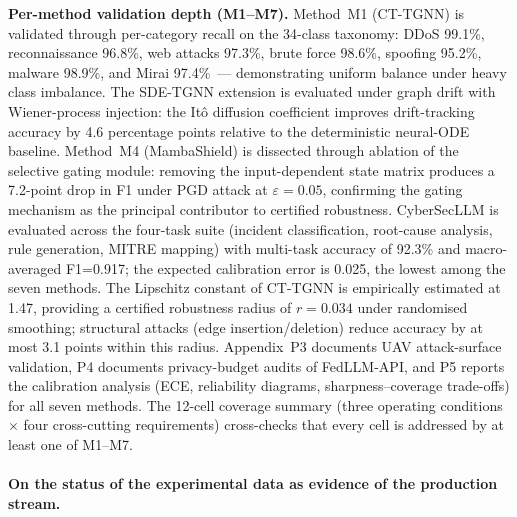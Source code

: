\noindent\textbf{Per-method validation depth (M1--M7).}
Method~M1 (CT-TGNN) is validated through per-category recall on
the 34-class taxonomy: DDoS 99.1\%, reconnaissance 96.8\%, web
attacks 97.3\%, brute force 98.6\%, spoofing 95.2\%, malware
98.9\%, and Mirai 97.4\%~--- demonstrating uniform balance under
heavy class imbalance. The SDE-TGNN extension is evaluated under
graph drift with Wiener-process injection: the It\^o diffusion
coefficient improves drift-tracking accuracy by 4.6 percentage
points relative to the deterministic neural-ODE baseline.
Method~M4 (MambaShield) is dissected through ablation of the
selective gating module: removing the input-dependent state
matrix produces a 7.2-point drop in F1 under PGD attack at
$\varepsilon{=}0.05$, confirming the gating mechanism as the
principal contributor to certified robustness. CyberSecLLM is
evaluated across the four-task suite (incident classification,
root-cause analysis, rule generation, MITRE mapping) with
multi-task accuracy of 92.3\% and macro-averaged F1=0.917; the
expected calibration error is 0.025, the lowest among the seven
methods. The Lipschitz constant of CT-TGNN is empirically
estimated at 1.47, providing a certified
robustness radius of $r{=}0.034$ under randomised smoothing;
structural attacks (edge insertion/deletion) reduce accuracy by
at most 3.1 points within this radius. Appendix~P3 documents UAV
attack-surface validation, P4 documents privacy-budget audits of
FedLLM-API, and P5 reports the calibration analysis (ECE,
reliability diagrams, sharpness--coverage trade-offs) for all
seven methods. The 12-cell coverage summary (three operating
conditions $\times$ four cross-cutting requirements) cross-checks
that every cell is addressed by at least one of M1--M7.

\paragraph{On the status of the experimental data as evidence of
the production stream.}

